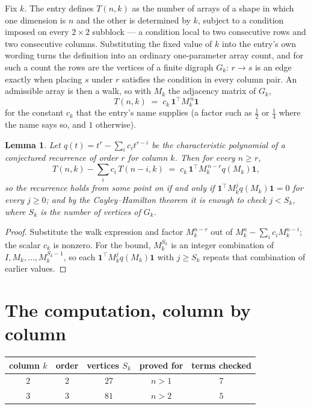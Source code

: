 \documentclass[11pt,a4paper]{article}
\theoremstyle{plain}
\newtheorem{lemma}[theorem]{Lemma}
\theoremstyle{definition}
\begin{document}
Fix $k$. The entry defines $T(n,k)$ as the number of arrays of a shape in which one dimension
is $n$ and the other is determined by $k$, subject to a condition imposed on every
$2\times2$ subblock --- a condition local to two consecutive rows and two consecutive columns.
Substituting the fixed value of $k$ into the entry's own wording turns the definition into an
ordinary one-parameter array count, and for such a count the rows are the vertices of a finite
digraph $G_k$: $r\to s$ is an edge exactly when placing $s$ under $r$ satisfies the condition
in every column pair. An admissible array is then a walk, so with $M_k$ the adjacency matrix
of $G_k$,
\[
T(n,k)\;=\;c_k\,\mathbf{1}^{\!\top}M_k^{\,n}\mathbf{1}
\]
for the constant $c_k$ that the entry's name supplies (a factor such as $\tfrac12$ or
$\tfrac14$ where the name says so, and $1$ otherwise).

\begin{lemma}\label{lem:crit}
Let $q(t)=t^{r}-\sum_i c_it^{r-i}$ be the characteristic polynomial of a conjectured
recurrence of order $r$ for column $k$. Then for every $n\ge r$,
\[
T(n,k)-\sum_i c_i\,T(n-i,k)\;=\;c_k\,\mathbf{1}^{\!\top}M_k^{\,n-r}q(M_k)\mathbf{1},
\]
so the recurrence holds from some point on if and only if
$\mathbf{1}^{\!\top}M_k^{j}q(M_k)\mathbf{1}=0$ for every $j\ge0$; and by the
Cayley--Hamilton theorem it is enough to check $j<S_k$, where $S_k$ is the number of vertices
of $G_k$.
\end{lemma}

\begin{proof}
Substitute the walk expression and factor $M_k^{n-r}$ out of $M_k^{n}-\sum_ic_iM_k^{n-i}$;
the scalar $c_k$ is nonzero. For the bound, $M_k^{S_k}$ is an integer combination of
$I,M_k,\dots,M_k^{S_k-1}$, so each $\mathbf{1}^{\!\top}M_k^{j}q(M_k)\mathbf{1}$ with
$j\ge S_k$ repeats that combination of earlier values.
\end{proof}

\section{The computation, column by column}

\begin{center}
\begin{tabular}{ccccc}
column $k$ & order & vertices $S_k$ & proved for & terms checked \\ \hline
$2$ & $2$ & $27$ & $n>1$ & $7$ \\
$3$ & $3$ & $81$ & $n>2$ & $5$ \\
\end{tabular}
\end{center}
\end{document}
